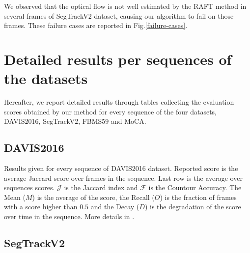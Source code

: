 \documentclass[10pt,twocolumn,letterpaper]{article}
\begin{document}
We observed that the optical flow is not well estimated by the RAFT method in several frames of SegTrackV2 dataset, causing our algorithm to fail on those frames. These failure cases are reported in Fig.\ref{failure-cases}.


\section{Detailed results per sequences of the datasets}
Hereafter, we report detailed results through tables collecting the evaluation scores obtained by our method for every sequence of the four datasets, DAVIS2016, SegTrackV2, FBMS59 and MoCA.

\subsection{DAVIS2016}

\begin{table}[H]\centering
{}
\caption{Results given for every sequence of DAVIS2016 dataset. Reported score is the average Jaccard score over frames in the sequence. Last row is the average over sequences scores.
$\mathcal{J}$ is the Jaccard index and $\mathcal{F}$ is the Countour Accuracy. The Mean ($M$) is the average of the score, the Recall ($O$) is the fraction of frames with a score higher than $0.5$ and the Decay ($D$) is the degradation of the score over time in the sequence. More details in \cite{pont-tuset_benchmark_2016}.}
\end{table}



\subsection{SegTrackV2}

\end{document}
